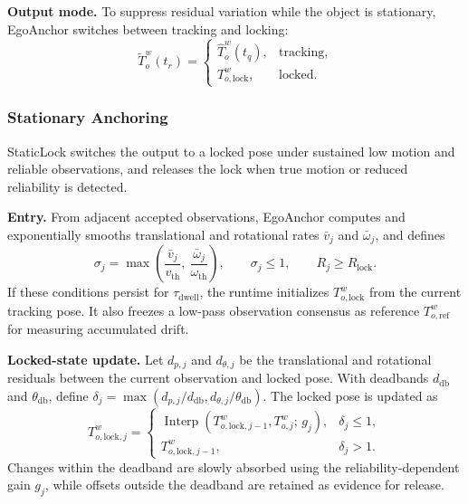 \documentclass[review]{vgtc}
\begin{document}
\textbf{Output mode.} To suppress residual variation while the object is stationary, EgoAnchor switches between tracking and locking:
\begin{equation}
\widetilde{T}_o^w(t_r) = \begin{cases}
\widehat{T}_o^w(t_q), & \text{tracking}, \\
T_{o,\mathrm{lock}}^w, & \text{locked}.
\end{cases}
\label{eq:staticlock}
\end{equation}

\subsubsection{Stationary Anchoring}\label{sec:staticlock}

StaticLock switches the output to a locked pose under sustained low motion and reliable observations, and releases the lock when true motion or reduced reliability is detected.

\textbf{Entry.} From adjacent accepted observations, EgoAnchor computes and exponentially smooths translational and rotational rates $\bar v_j$ and $\bar\omega_j$, and defines
\begin{equation}
\sigma_j = \max\left(\frac{\bar{v}_j}{v_{\mathrm{th}}},\ \frac{\bar{\omega}_j}{\omega_{\mathrm{th}}}\right), \qquad \sigma_j \leq 1, \qquad R_j \geq R_{\mathrm{lock}}.
\label{eq:lock-entry}
\end{equation}
If these conditions persist for $\tau_{\mathrm{dwell}}$, the runtime initializes $T_{o,\mathrm{lock}}^w$ from the current tracking pose. It also freezes a low-pass observation consensus as reference $T_{o,\mathrm{ref}}^w$ for measuring accumulated drift.

\textbf{Locked-state update.} Let $d_{p,j}$ and $d_{\theta,j}$ be the translational and rotational residuals between the current observation and locked pose. With deadbands $d_{\mathrm{db}}$ and $\theta_{\mathrm{db}}$, define $\delta_j=\max(d_{p,j}/d_{\mathrm{db}},d_{\theta,j}/\theta_{\mathrm{db}})$. The locked pose is updated as
\begin{equation}
T_{o,\mathrm{lock},j}^w =
\begin{cases}
\operatorname{Interp}\left(T_{o,\mathrm{lock},j-1}^w, T_{o,j}^{w};\, g_j\right), & \delta_j \leq 1, \\
T_{o,\mathrm{lock},j-1}^w, & \delta_j > 1.
\end{cases}
\label{eq:lock-update}
\end{equation}
Changes within the deadband are slowly absorbed using the reliability-dependent gain $g_j$, while offsets outside the deadband are retained as evidence for release.
\end{document}
